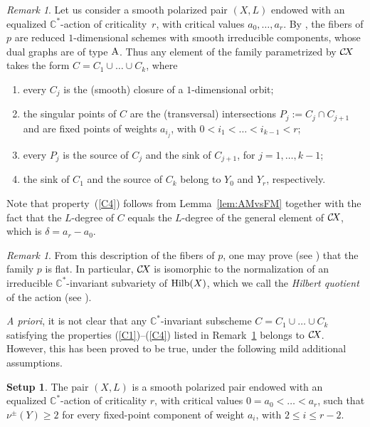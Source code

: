 \documentclass[10pt,a4paper]{article}
\numberwithin{equation}{section}
\theoremstyle{definition}
\newtheorem{setup}[theorem]{Setup}
\theoremstyle{remark}
\newtheorem{remark}[theorem]{Remark}
\def\C{{\mathbb C}}
\def\operatorname#1{\mathop{\rm #1}\nolimits}
\def\DA{{\rm A}}
\def\Hilb{\operatorname{Hilb}}
\def\CX{\mathcal{C}\!X\hspace{-0.5pt}}
\begin{document}
\begin{remark}\label{rem:chains} 
Let us consider a smooth polarized pair $(X,L)$ endowed with an equalized $\C^*$-action of criticality~$r$, with critical values $a_0,\dots,a_r$. By \cite[Lemma~4.3]{WORS6}, the fibers of $p$ are reduced $1$-dimensional schemes with smooth irreducible components, whose dual graphs are of type $\DA$. Thus any element of the family parametrized by $\CX$ takes the form $C=C_1\cup\dots\cup C_k$, 
where 
\begin{enumerate}[label=(C\arabic*),ref=C\arabic*]
\item\label{C1} every $C_j$ is the (smooth) closure of a $1$-dimensional orbit; 
\item\label{C2} the singular points of $C$ are the (transversal) intersections $P_j:=C_j\cap C_{j+1}$ and are fixed points of weights $a_{i_j}$, with  $0<i_1<\dots<i_{k-1}<r$; 
\item\label{C3} every $P_j$ is the source of $C_j$ and the sink of $C_{j+1}$, for $j=1,\dots,k-1$;  
\item\label{C4} the sink of $C_1$ and the source of $C_k$ belong to $Y_0$ and $Y_r$, respectively.
\end{enumerate}
Note that property~(\ref{C4}) follows from Lemma~\ref{lem:AMvsFM} together with the fact that the $L$-degree of $C$ equals the $L$-degree of the general element of $\CX$, which is $\delta=a_r-a_0$.
\end{remark}

\begin{remark}\label{rem:Hilb} From this description of the fibers of $p$, one may prove (see \cite[Lemma~4.5]{WORS6}) that the family $p$ is flat. In particular, $\CX$ is isomorphic to the normalization of an irreducible $\C^*$-invariant subvariety of $\Hilb(X)$, which we call the {\em Hilbert quotient} of the action (see \cite[Remark~4.6]{WORS6}). 
\end{remark}

\textit{A priori}, it is not clear that any $\C^*$-invariant subscheme $C=C_1\cup\dots\cup C_k$ satisfying the properties (\ref{C1})--(\ref{C4}) listed in Remark~\ref{rem:chains} belongs to $\CX$. However, this has been proved to be true, under the following mild additional assumptions. 

\begin{setup}\label{set:WORS6}
The pair $(X,L)$ is a smooth polarized pair endowed with an equalized $\C^*$-action of criticality $r$, with critical values $0=a_0<\dots<a_r$, such that $\nu^\pm(Y) \ge 2$ for every fixed-point component of weight $a_i$, with $2 \le i \le r-2$.
\end{setup} 
\end{document}
